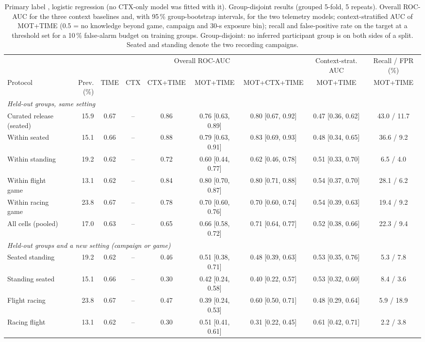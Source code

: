 \begin{table}[t]
\centering
\footnotesize
\caption{Primary label \sevtwo{}, logistic regression (no CTX-only model was fitted with it). Group-disjoint results (grouped 5-fold, 5 repeats). Overall ROC-AUC for the three context baselines and, with 95\,\% group-bootstrap intervals, for the two telemetry models; context-stratified AUC of MOT+TIME (0.5 = no knowledge beyond game, campaign and 30-s exposure bin); recall and false-positive rate on the target at a threshold set for a 10\,\% false-alarm budget on training groups. Group-disjoint: no inferred participant group is on both sides of a split. Seated and standing denote the two recording campaigns.}
\label{tab:supp_lr}
\footnotesize
\setlength{\tabcolsep}{2.4pt}
\begin{tabular}{lrccccccc}
\toprule
 & & \multicolumn{5}{c}{Overall ROC-AUC} & Context-strat. AUC & Recall / FPR (\%) \\
\cmidrule(lr){3-7}\cmidrule(lr){8-8}\cmidrule(lr){9-9}
Protocol & Prev. (\%) & TIME & CTX & CTX+TIME & MOT+TIME & MOT+CTX+TIME & MOT+TIME & MOT+TIME \\
\midrule
\multicolumn{9}{l}{\emph{Held-out groups, same setting}} \\
Curated release (seated) & 15.9 & 0.67 & -- & 0.86 & 0.76 [0.63, 0.89] & 0.80 [0.67, 0.92] & 0.47 [0.36, 0.62] & 43.0 / 11.7 \\
Within seated & 15.1 & 0.66 & -- & 0.88 & 0.79 [0.63, 0.91] & 0.83 [0.69, 0.93] & 0.48 [0.34, 0.65] & 36.6 / 9.2 \\
Within standing & 19.2 & 0.62 & -- & 0.72 & 0.60 [0.44, 0.77] & 0.62 [0.46, 0.78] & 0.51 [0.33, 0.70] & 6.5 / 4.0 \\
Within flight game & 13.1 & 0.62 & -- & 0.84 & 0.80 [0.70, 0.87] & 0.80 [0.71, 0.88] & 0.54 [0.37, 0.70] & 28.1 / 6.2 \\
Within racing game & 23.8 & 0.67 & -- & 0.78 & 0.70 [0.60, 0.76] & 0.70 [0.60, 0.74] & 0.54 [0.39, 0.63] & 19.4 / 9.2 \\
All cells (pooled) & 17.0 & 0.63 & -- & 0.65 & 0.66 [0.58, 0.72] & 0.71 [0.64, 0.77] & 0.52 [0.38, 0.66] & 22.3 / 9.4 \\
\multicolumn{9}{l}{\emph{Held-out groups and a new setting (campaign or game)}} \\
Seated \ra{} standing & 19.2 & 0.62 & -- & 0.46 & 0.51 [0.38, 0.71] & 0.48 [0.39, 0.63] & 0.53 [0.35, 0.76] & 5.3 / 7.8 \\
Standing \ra{} seated & 15.1 & 0.66 & -- & 0.30 & 0.42 [0.24, 0.58] & 0.40 [0.22, 0.57] & 0.53 [0.32, 0.60] & 8.4 / 3.6 \\
Flight \ra{} racing & 23.8 & 0.67 & -- & 0.47 & 0.39 [0.24, 0.53] & 0.60 [0.50, 0.71] & 0.48 [0.29, 0.64] & 5.9 / 18.9 \\
Racing \ra{} flight & 13.1 & 0.62 & -- & 0.30 & 0.51 [0.41, 0.61] & 0.31 [0.22, 0.45] & 0.61 [0.42, 0.71] & 2.2 / 3.8 \\
\bottomrule
\end{tabular}
\end{table}